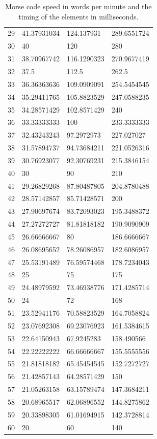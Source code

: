\documentclass[a4paper]{tufte-handout}
\begin{document}
\begin{table}[!h]
\begin{tabular}{llll}
            29 & 41.37931034 & 124.137931 & 289.6551724 \\
            30 & 40 & 120 & 280 \\
            31 & 38.70967742 & 116.1290323 & 270.9677419 \\
            32 & 37.5 & 112.5 & 262.5 \\
            33 & 36.36363636 & 109.0909091 & 254.5454545 \\
            34 & 35.29411765 & 105.8823529 & 247.0588235 \\
            35 & 34.28571429 & 102.8571429 & 240 \\
            36 & 33.33333333 & 100 & 233.3333333 \\
            37 & 32.43243243 & 97.2972973 & 227.027027 \\
            38 & 31.57894737 & 94.73684211 & 221.0526316 \\
            39 & 30.76923077 & 92.30769231 & 215.3846154 \\
            40 & 30 & 90 & 210 \\
            41 & 29.26829268 & 87.80487805 & 204.8780488 \\
            42 & 28.57142857 & 85.71428571 & 200 \\
            43 & 27.90697674 & 83.72093023 & 195.3488372 \\
            44 & 27.27272727 & 81.81818182 & 190.9090909 \\
            45 & 26.66666667 & 80 & 186.6666667 \\
            46 & 26.08695652 & 78.26086957 & 182.6086957 \\
            47 & 25.53191489 & 76.59574468 & 178.7234043 \\
            48 & 25 & 75 & 175 \\
            49 & 24.48979592 & 73.46938776 & 171.4285714 \\
            50 & 24 & 72 & 168 \\
            51 & 23.52941176 & 70.58823529 & 164.7058824 \\
            52 & 23.07692308 & 69.23076923 & 161.5384615 \\
            53 & 22.64150943 & 67.9245283 & 158.490566 \\
            54 & 22.22222222 & 66.66666667 & 155.5555556 \\
            55 & 21.81818182 & 65.45454545 & 152.7272727 \\
            56 & 21.42857143 & 64.28571429 & 150 \\
            57 & 21.05263158 & 63.15789474 & 147.3684211 \\
            58 & 20.68965517 & 62.06896552 & 144.8275862 \\
            59 & 20.33898305 & 61.01694915 & 142.3728814 \\
            60 & 20 & 60 & 140 \\
            \bottomrule
        \end{tabular}
        \caption{Morse code speed in words per minute and the timing of the elements in milliseconds.}
        \label{tab:morsetab}
    \end{table}
\end{document}
